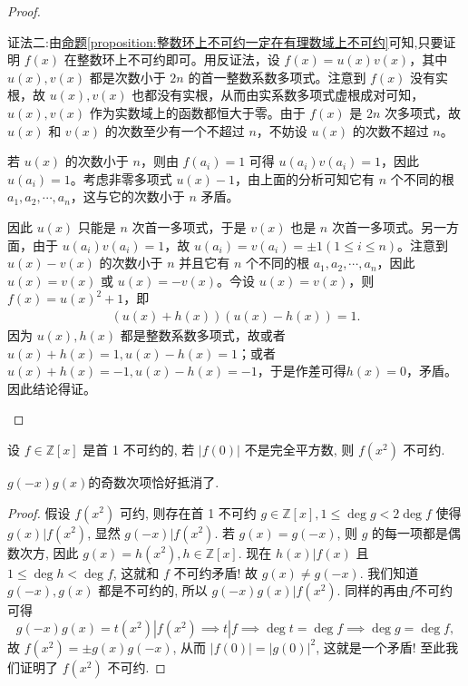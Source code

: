 \documentclass[../../main.tex]{subfiles}
\begin{document}
\begin{proof}
\begin{enumerate}
{\color{blue}证法二:}由\hyperref[proposition:整数环上不可约一定在有理数域上不可约]{命题\ref{proposition:整数环上不可约一定在有理数域上不可约}}可知,只要证明 $f(x)$ 在整数环上不可约即可。用反证法，设 $f(x) = u(x)v(x)$，其中 $u(x), v(x)$ 都是次数小于 $2n$ 的首一整数系数多项式。注意到 $f(x)$ 没有实根，故
$u(x), v(x)$
也都没有实根，从而由实系数多项式虚根成对可知，$u(x), v(x)$ 作为实数域上的函数都恒大于零。由于 $f(x)$ 是 $2n$ 次多项式，故 $u(x)$ 和 $v(x)$ 的次数至少有一个不超过 $n$，不妨设 $u(x)$ 的次数不超过 $n$。

若 $u(x)$ 的次数小于 $n$，则由 $f(a_i) = 1$ 可得 $u(a_i)v(a_i) = 1$，因此 $u(a_i) = 1$。考虑非零多项式 $u(x) - 1$，由上面的分析可知它有 $n$ 个不同的根 $a_1, a_2, \cdots, a_n$，这与它的次数小于 $n$ 矛盾。

因此 $u(x)$ 只能是 $n$ 次首一多项式，于是 $v(x)$ 也是 $n$ 次首一多项式。另一方面，由于 $u(a_i)v(a_i) = 1$，故 $u(a_i) = v(a_i) = \pm 1 (1 \leqslant  i \leqslant  n)$。注意到 $u(x) - v(x)$ 的次数小于 $n$ 并且它有 $n$ 个不同的根 $a_1, a_2, \cdots, a_n$，因此 $u(x) = v(x)$ 或 $u(x) = -v(x)$。今设 $u(x) = v(x)$，则 $f(x) = u(x)^2 + 1$，即
\begin{align*}
(u(x) + h(x))(u(x) - h(x)) = 1.
\end{align*}
因为 $u(x), h(x)$ 都是整数系数多项式，故或者 $u(x) + h(x) = 1, u(x) - h(x) = 1$；或者 $u(x) + h(x) = -1, u(x) - h(x) = -1$，于是作差可得$h(x) = 0$，矛盾。因此结论得证。
\end{enumerate}

\end{proof}

\begin{example}\label{example:不可约多项式证明例题11}
设 \( f \in \mathbb{Z}[x] \) 是首 1 不可约的, 若 \( |f(0)| \) 不是完全平方数, 则 \( f(x^2) \) 不可约.
\end{example}
\begin{remark}
$g(-x)g(x)$的奇数次项恰好抵消了.
\end{remark}
\begin{proof}
假设 \( f(x^2) \) 可约, 则存在首 1 不可约 \( g \in \mathbb{Z}[x], 1 \leq \deg g < 2\deg f \) 使得 \( g(x)|f(x^2) \), 显然 \( g(-x)|f(x^2) \). 若 \( g(x) = g(-x) \), 则 \( g \) 的每一项都是偶数次方, 因此 \( g(x) = h(x^2), h \in \mathbb{Z}[x] \). 现在 \( h(x)|f(x) \) 且 \( 1 \leq \deg h < \deg f \), 这就和 \( f \) 不可约矛盾! 故 \( g(x) \neq g(-x) \). 我们知道 \( g(-x), g(x) \) 都是不可约的, 所以 \( g(-x)g(x)|f(x^2) \). 同样的再由$f$不可约可得
\[
g(-x)g(x) = t(x^2)|f(x^2) \implies t|f \implies \deg t = \deg f \implies \deg g = \deg f,
\]
故 \( f(x^2) = \pm g(x)g(-x) \), 从而 \( |f(0)| = |g(0)|^2 \), 这就是一个矛盾! 至此我们证明了 \( f(x^2) \) 不可约.

\end{proof}
\end{document}
